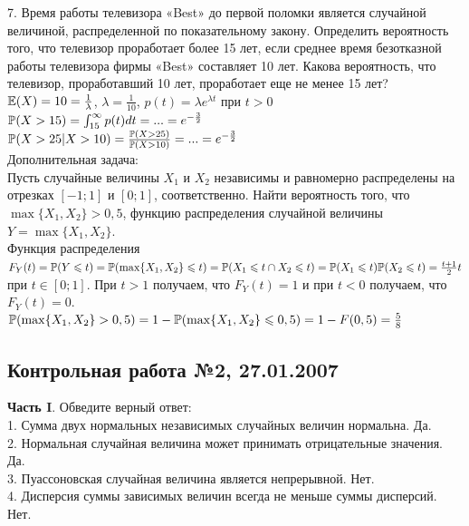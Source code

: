 \documentclass[12pt, a4paper]{article}\usepackage[]{graphicx}\usepackage[]{color}
\begin{document}
7.  Время работы телевизора «Best» до первой поломки является
случайной величиной, распределенной по показательному закону.
Определить вероятность того, что телевизор проработает более 15
лет, если среднее время безотказной работы телевизора фирмы «Best»
составляет 10 лет. Какова вероятность, что телевизор,
проработавший 10 лет, проработает еще не менее 15 лет? \\

$\E(X)=10=\frac{1}{\lambda}$, $\lambda=\frac{1}{10}$, $p(t)=\lambda
e^{\lambda t}$ при $t>0$ \\
$\P(X>15)=\int_{15}^{\infty}p(t)dt=...=e^{-\frac{3}{2}}$ \\
$\P(X>25|X>10)=\frac{\P(X>25)}{\P(X>10)}=...=e^{-\frac{3}{2}}$ \\

Дополнительная задача: \\
Пусть случайные величины $X_{1}$ и $X_{2}$ независимы и равномерно
распределены на отрезках $[-1;1]$ и $[0;1]$, соответственно. Найти
вероятность того, что $\max\{X_{1},X_{2}\}>0,5$, функцию
распределения случайной величины $Y=\max\{X_{1},X_{2}\}$. \\
Функция распределения $F_{Y}(t)=\P(Y\le t)=\P(\max\{X_{1},X_{2}\}\le
t)=\P(X_{1}\le t\cap X_{2}\le t)=\P(X_{1}\le t)\P(X_{2}\le
t)=\frac{t+1}{2}t$ при $t\in [0;1]$. При $t>1$ получаем, что
$F_{Y}(t)=1$ и при $t<0$ получаем, что $F_{Y}(t)=0$. \\
$\P(\max\{X_{1},X_{2}\}>0,5)=1-\P(\max\{X_{1},X_{2}\}\le
0,5)=1-F(0,5)=\frac{5}{8}$ \\




\subsection{Контрольная работа №2, 27.01.2007}

 \textbf{Часть I}. Обведите верный ответ: \\

1. Сумма двух нормальных независимых случайных величин нормальна.
Да. \\

2. Нормальная случайная величина может принимать отрицательные
значения. Да. \\

3. Пуассоновская случайная величина является непрерывной. Нет.
\\

4. Дисперсия суммы зависимых величин всегда не меньше суммы
дисперсий. Нет. \\
\end{document}
